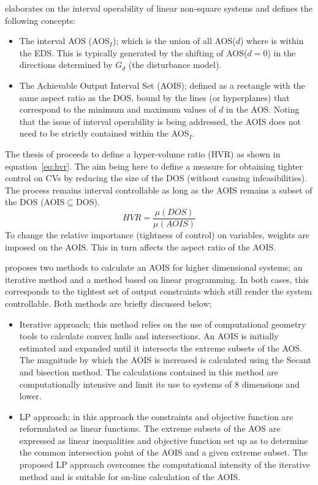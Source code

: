 \citet{limaphd} elaborates on the interval operability of linear non-square systems and defines the following concepts:
\begin{itemize}
  \item The interval AOS (AOS$_I$); which is the union of all AOS($d$) where is within the EDS. 
This is typically generated by the shifting of AOS($d=0$) in the directions determined by $G_d$ (the disturbance model).
  \item The Achievable Output Interval Set (AOIS); defined as a rectangle with the same aspect ratio as the DOS, bound by the lines (or hyperplanes) that correspond to the minimum and maximum values of $d$ in the AOS. 
Noting that the issue of interval operability is being addressed, the AOIS does not need to be strictly contained within the AOS$_I$.
\end{itemize}
The thesis of \citet{limaphd} proceeds to define a hyper-volume ratio (HVR) as shown in equation~\ref{eq:hvr}. 
The aim being here to define a measure for obtaining tighter control on CVs by reducing the size of the DOS (without causing infeasibilities). 
The process remains interval controllable as long as the AOIS remains a subset of the DOS (AOIS$\subseteq$DOS).
\begin{equation}
  \label{eq:hvr}
    HVR = \frac{\mu(DOS)}{\mu(AOIS)}
\end{equation}
To change the relative importance (tightness of control) on variables, weights are imposed on the AOIS. 
This in turn affects the aspect ratio of the AOIS.

\citet{limaphd} proposes two methods to calculate an AOIS for higher dimensional systems; an iterative method and a method based on linear programming. 
In both cases, this corresponds to the tightest set of output constraints which still render the system controllable. 
Both methods are briefly discussed below;
\begin{itemize}
  \item Iterative approach; this method relies on the use of computational geometry tools to calculate convex hulls and intersections. 
An AOIS is initially estimated and expanded until it intersects the extreme subsets of the AOS. 
The magnitude by which the AOIS is increased is calculated using the Secant and bisection method. 
The calculations contained in this method are computationally intensive and limit its use to systems of 8 dimensions and lower.
  \item LP approach; in this approach the constraints and objective function are reformulated as linear functions. 
The extreme subsets of the AOS are expressed as linear inequalities and objective function set up as to determine the common intersection point of the AOIS and a given extreme subset. 
The proposed LP approach overcomes the computational intensity of the iterative method and is suitable for on-line calculation of the AOIS.
\end{itemize}

